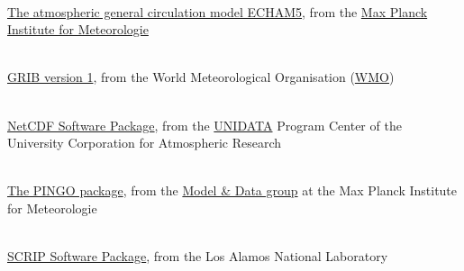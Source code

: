 \begin{thebibliography}{xx}

 \ \\
  \href{http://www.mpimet.mpg.de/wissenschaft/publikationen/reports.html}
       {The atmospheric general circulation model ECHAM5},
  from the
  \href{http://www.mpimet.mpg.de}
       {Max Planck Institute for Meteorologie}

 \ \\
  \href{http://www.wmo.ch/web/www/WMOCodes/Guides/GRIB/GRIB1-Contents.html}
       {GRIB version 1},
  from the World Meteorological Organisation
  (\href{http://www.wmo.ch}{WMO})

 \ \\
  \href{http://www.unidata.ucar.edu/packages/netcdf/index.html}{NetCDF Software Package},
  from the
  \href{http://www.unidata.ucar.edu}{UNIDATA}
  Program Center of the University Corporation for Atmospheric Research

 \ \\
  \href{http://www.mad.zmaw.de/Pingo/post/down/BigPingo.pdf}{The PINGO package},
  from the
  \href{http://www.mad.zmaw.de}{Model \& Data group}
  at the Max Planck Institute for Meteorologie

 \ \\
  \href{http://climate.lanl.gov/Software/SCRIP}{SCRIP Software Package},
  from the Los Alamos National Laboratory

\end{thebibliography}
